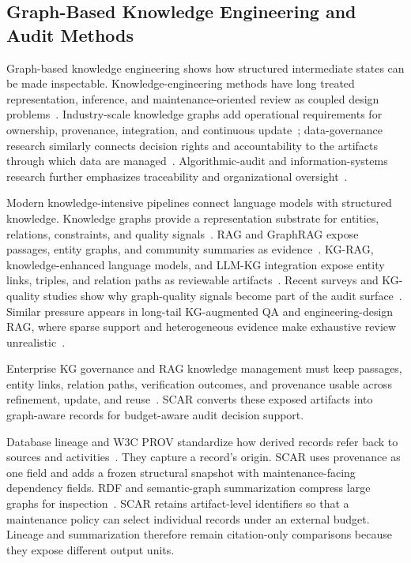 \documentclass[pdflatex,sn-basic]{sn-jnl}
\begin{document}
\subsection{Graph-Based Knowledge Engineering and Audit Methods}

Graph-based knowledge engineering shows how structured intermediate states can be made inspectable. Knowledge-engineering methods have long treated representation, inference, and maintenance-oriented review as coupled design problems~\citep{studer1998knowledge}. Industry-scale knowledge graphs add operational requirements for ownership, provenance, integration, and continuous update~\citep{noy2019industry}; data-governance research similarly connects decision rights and accountability to the artifacts through which data are managed~\citep{abraham2019data}. Algorithmic-audit and information-systems research further emphasizes traceability and organizational oversight~\citep{dwivedi2021artificial,raji2020closing}.

Modern knowledge-intensive pipelines connect language models with structured knowledge. Knowledge graphs provide a representation substrate for entities, relations, constraints, and quality signals~\citep{hogan2021knowledge}. RAG and GraphRAG expose passages, entity graphs, and community summaries as evidence~\citep{edge2024graphrag,gao2023ragsurvey,lewis2020rag}. KG-RAG, knowledge-enhanced language models, and LLM-KG integration expose entity links, triples, and relation paths as reviewable artifacts~\citep{hu2024knowledgeenhanced,pan2024unifying,sanmartin2024kgrag}. Recent surveys and KG-quality studies show why graph-quality signals become part of the audit surface~\citep{chen2025kgquality,dai2025llmkg,yang2025kbllmsurvey}. Similar pressure appears in long-tail KG-augmented QA and engineering-design RAG, where sparse support and heterogeneous evidence make exhaustive review unrealistic~\citep{huang2025prompting,liu2025knowledgereasoning,siddharth2024retrieval}.

Enterprise KG governance and RAG knowledge management must keep passages, entity links, relation paths, verification outcomes, and provenance usable across refinement, update, and reuse~\citep{higgins2008dcc,paulheim2017knowledge}. SCAR converts these exposed artifacts into graph-aware records for budget-aware audit decision support.

Database lineage and W3C PROV standardize how derived records refer back to sources and activities~\citep{cheney2009provenance,lebo2013prov}. They capture a record's origin. SCAR uses provenance as one field and adds a frozen structural snapshot with maintenance-facing dependency fields. RDF and semantic-graph summarization compress large graphs for inspection~\citep{cebiric2019summarizing,sacenti2021kgsummarization}. SCAR retains artifact-level identifiers so that a maintenance policy can select individual records under an external budget. Lineage and summarization therefore remain citation-only comparisons because they expose different output units.
\end{document}
